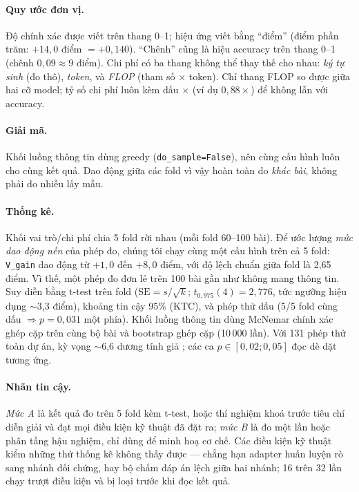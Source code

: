 \documentclass[11pt,a4paper]{article}
\begin{document}
\paragraph{Quy ước đơn vị.} Độ chính xác được viết trên thang 0--1; hiệu ứng viết bằng ``điểm''
(điểm phần trăm: $+14{,}0$ điểm $= +0{,}140$). ``Chênh'' cũng là hiệu accuracy trên thang 0--1
(chênh $0{,}09 \approx 9$ điểm). Chi phí có ba thang không thể thay thế cho nhau: \emph{ký tự
sinh} (đo thô), \emph{token}, và \emph{FLOP} (tham số $\times$ token). Chỉ thang FLOP so được
giữa hai cỡ model; tỷ số chi phí luôn kèm dấu $\times$ (ví dụ $0{,}88\times$) để không lẫn với
accuracy.

\paragraph{Giải mã.} Khối luồng thông tin dùng greedy (\texttt{do\_sample=False}), nên cùng
cấu hình luôn cho cùng kết quả. Dao động giữa các fold vì vậy hoàn toàn do \emph{khác bài},
không phải do nhiễu lấy mẫu.

\paragraph{Thống kê.} Khối vai trò/chi phí chia 5 fold rời nhau (mỗi fold 60--100 bài). Để
ước lượng \emph{mức dao động nền} của phép đo, chúng tôi chạy cùng một
cấu hình trên cả 5 fold: \texttt{V\_gain} dao động từ $+1{,}0$ đến $+8{,}0$ điểm, với độ lệch
chuẩn giữa fold là 2,65 điểm. Vì thế, một phép đo đơn lẻ trên 100 bài gần như không mang thông
tin. Suy diễn bằng t-test trên fold ($\mathrm{SE}=s/\sqrt{k}$;
$t_{0{,}975}(4)=2{,}776$, tức ngưỡng hiệu dụng $\sim$3,3 điểm), khoảng tin cậy 95\% (KTC), và
phép thử dấu (5/5 fold cùng dấu $\Rightarrow p=0{,}031$ một phía). Khối luồng thông tin dùng
McNemar chính xác ghép cặp trên cùng bộ bài và bootstrap ghép cặp (10\,000 lần). Với 131 phép
thử toàn dự án, kỳ vọng $\sim$6,6 dương tính giả \cite{bh1995}; các ca $p \in [0{,}02;0{,}05]$
đọc dè dặt tương ứng.

\paragraph{Nhãn tin cậy.} \emph{Mức A} là kết quả đo trên 5 fold kèm t-test, hoặc thí nghiệm
khoá trước tiêu chí diễn giải và đạt mọi điều kiện kỹ thuật đã đặt ra; \emph{mức B} là đo một
lần hoặc phân tầng hậu nghiệm, chỉ dùng để minh hoạ cơ chế. Các điều kiện kỹ thuật kiểm những thứ
thống kê không thấy được --- chẳng hạn adapter huấn luyện rò sang nhánh đối chứng, hay bộ chấm
đáp án lệch giữa hai nhánh; 16 trên 32 lần chạy trượt điều kiện và bị loại trước khi đọc kết quả.
\end{document}
